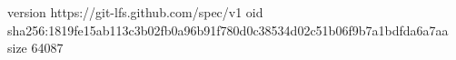 version https://git-lfs.github.com/spec/v1
oid sha256:1819fe15ab113c3b02fb0a96b91f780d0c38534d02c51b06f9b7a1bdfda6a7aa
size 64087
